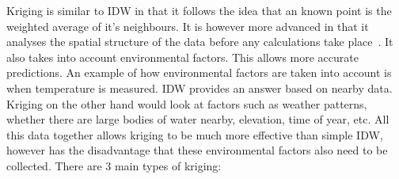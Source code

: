
Kriging is similar to IDW in that it follows the idea that an known point is the weighted average of it's neighbours. It is however more advanced in that it analyses the spatial structure of the data before any calculations take place~\cite{geostatisticalradiomapping}. It also takes into account environmental factors. This allows more accurate predictions. An example of how environmental factors are taken into account is when temperature is measured. IDW provides an answer based on nearby data. Kriging on the other hand would look at factors such as weather patterns, whether there are large bodies of water nearby, elevation, time of year, etc. All this data together allows kriging to be much more effective than simple IDW, however has the disadvantage that these environmental factors also need to be collected. There are 3 main types of kriging:

